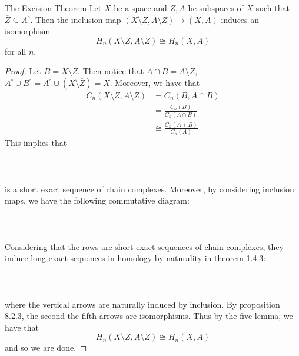 \documentclass[a4paper]{article}
\begin{document}
\begin{thm}{The Excision Theorem}{} Let $X$ be a space and $Z,A$ be subspaces of $X$ such that $\overline{Z}\subseteq A^\circ$. Then the inclusion map $(X\setminus Z,A\setminus Z)\to (X,A)$ induces an isomorphism $$H_n(X\setminus Z,A\setminus Z)\cong H_n(X,A)$$ for all $n$. \tcbline
\begin{proof}
Let $B=X\setminus Z$. Then notice that $A\cap B=A\setminus Z$, $A^\circ\cup B^\circ=A^\circ\cup(X\setminus\overline{Z})=X$. Moreover, we have that 
\begin{align*}
C_n(X\setminus Z,A\setminus Z)&=C_n(B,A\cap B)\\
&=\frac{C_n(B)}{C_n(A\cap B)}\tag{By definition}\\
&\cong\frac{C_n(A+B)}{C_n(A)}\tag{Second Isomorphism Theorem}
\end{align*}
This implies that \\~\\
\\~\\
is a short exact sequence of chain complexes. Moreover, by considering inclusion maps, we have the following commutative diagram: \\~\\
\\~\\
Considering that the rows are short exact sequences of chain complexes, they induce long exact sequences in homology by naturality in theorem 1.4.3: \\~\\
\\~\\
where the vertical arrows are naturally induced by inclusion. By proposition 8.2.3, the second the fifth arrows are isomorphisms. Thus by the five lemma, we have that $$H_n(X\setminus Z,A\setminus Z)\cong H_n(X,A)$$ and so we are done. 
\end{proof}
\end{thm}
\end{document}
